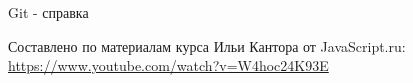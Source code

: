 \documentclass[12pt, a4paper]{article}
\begin{document}
		
\begin{center} {\Huge Git - справка} \end{center}

\noindent Составлено по материалам курса Ильи Кантора от JavaScript.ru: \\ 
\indent \href{https://www.youtube.com/watch?v=W4hoc24K93E&list=PLDyvV36pndZFHXjXuwA_NywNrVQO0aQqb}
{https://www.youtube.com/watch?v=W4hoc24K93E}  \\






















	
\end{document}
